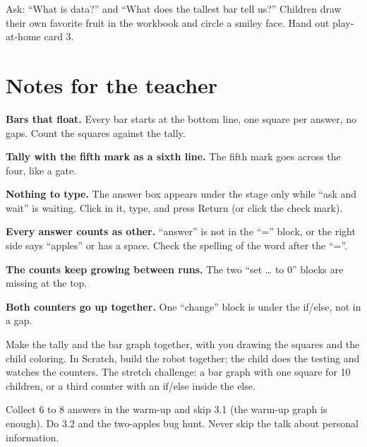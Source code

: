 \begin{reflection}
Ask: \enquote{What is data?} and \enquote{What does the tallest bar tell us?} Children draw their own favorite fruit in the workbook and circle a smiley face. Hand out play-at-home card 3.
\end{reflection}

\section{Notes for the teacher}
\begin{commonmistakes}
  \item \textbf{Bars that float.} Every bar starts at the bottom line, one square per answer, no gaps. Count the squares against the tally.
  \item \textbf{Tally with the fifth mark as a sixth line.} The fifth mark goes across the four, like a gate.
  \item \textbf{Nothing to type.} The answer box appears under the stage only while \enquote{ask and wait} is waiting. Click in it, type, and press Return (or click the check mark).
  \item \textbf{Every answer counts as other.} \enquote{answer} is not in the \enquote{=} block, or the right side says \enquote{apples} or has a space. Check the spelling of the word after the \enquote{=}.
  \item \textbf{The counts keep growing between runs.} The two \enquote{set \ldots{} to 0} blocks are missing at the top.
  \item \textbf{Both counters go up together.} One \enquote{change} block is under the if/else, not in a gap.
\end{commonmistakes}

\begin{differentiation}
\supportpath Make the tally and the bar graph together, with you drawing the squares and the child coloring. In Scratch, build the robot together; the child does the testing and watches the counters.
\extensionpath The stretch challenge: a bar graph with one square for 10 children, or a third counter with an if/else inside the else.
\end{differentiation}

\begin{teachernote}
Collect 6 to 8 answers in the warm-up and skip 3.1 (the warm-up graph is enough). Do 3.2 and the two-apples bug hunt. Never skip the talk about personal information.
\end{teachernote}
